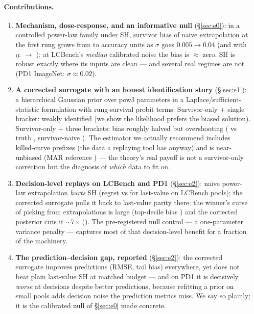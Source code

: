 \documentclass[10pt]{article}
\begin{document}
\paragraph{Contributions.}
\begin{enumerate}
\item \textbf{Mechanism, dose-response, and an informative null}
(\S\ref{sec:e0}): in a controlled power-law family under SH, survivor
bias of naive extrapolation at the first rung grows from
\GateBiasSigLo{} to \GateBiasSigXhi{} accuracy units as $\sigma$ goes
$0.005 \to 0.04$ (and with $\eta$: \GateBiasEtaTwo{} $\to$
\GateBiasEtaFour); at LCBench's \emph{median} calibrated noise the bias
is $\approx$ zero. SH is robust exactly where its inputs are clean ---
and several real regimes are not (PD1 ImageNet: $\sigma \approx 0.02$).
\item \textbf{A corrected surrogate with an honest identification story}
(\S\ref{sec:e1}): a hierarchical Gaussian prior over pow3 parameters in
a Laplace/sufficient-statistic formulation with rung-survival probit
terms. Survivor-only + single bracket: weakly identified (we show the
likelihood prefers the biased solution). Survivor-only + three brackets:
bias roughly halved but overshooting (\PopMuAHeckMB{} vs truth
\PopTrueMuA{}, survivor-naive \PopMuANaive{}). The estimator we actually
recommend includes killed-curve prefixes (the data a replaying tool has
anyway) and is near-unbiased (MAR reference \PopMuAEBAll{}) --- the
theory's real payoff is not a survivor-only correction but the diagnosis
of \emph{which} data to fit on.
\item \textbf{Decision-level replays on LCBench and PD1}
(\S\ref{sec:e2}): naive power-law extrapolation \emph{hurts} SH
(regret \RegLCBPow{} vs \RegLCBLast{} for last-value on LCBench pools);
the corrected surrogate pulls it back to last-value parity there; the
winner's curse of picking from extrapolations is large (top-decile bias
\TopBiasLCBPow) and the corrected posterior cuts it $\sim$7$\times$
(\TopBiasLCBEB). The pre-registered null control --- a one-parameter
variance penalty --- captures most of that decision-level benefit for a
fraction of the machinery.
\item \textbf{The prediction--decision gap, reported} (\S\ref{sec:e2}):
the corrected surrogate improves predictions (RMSE, tail bias) everywhere,
yet does not beat plain last-value SH at matched budget --- and on PD1 it
is decisively \emph{worse} at decisions despite better predictions,
because refitting a prior on small pools adds decision noise the
prediction metrics miss. We say so plainly; it is the calibrated null of
\S\ref{sec:e0} made concrete.
\end{enumerate}
\end{document}
